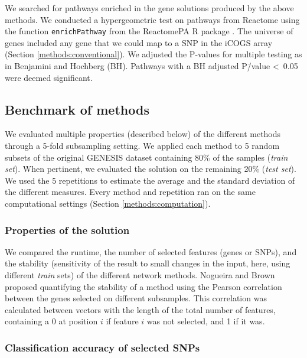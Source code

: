 \documentclass[10pt,letterpaper]{article}
\begin{document}
We searched for pathways enriched in the gene solutions produced by the above methods. We conducted a hypergeometric test on pathways from Reactome \cite{Jassal2019} using the function \texttt{enrichPathway} from the ReactomePA R package \cite{Yu2016}. The universe of genes included any gene that we could map to a SNP in the iCOGS array (Section \ref{methods:conventional}). We adjusted the P-values for multiple testing as in Benjamini and Hochberg \cite{Benjamini1995} (BH). Pathways with a BH adjusted P\=/value \textless~0.05 were deemed significant.

\subsection{Benchmark of methods}
\label{methods:benchmark}

We evaluated multiple properties (described below) of the different methods through a 5-fold subsampling setting. We applied each method to 5 random subsets of the original GENESIS dataset containing 80\% of the samples (\emph{train set}). When pertinent, we evaluated the solution on the remaining 20\% (\emph{test set}). We used the 5 repetitions to estimate the average and the standard deviation of the different measures. Every method and repetition ran on the same computational settings (Section \ref{methods:computation}).

\subsubsection{Properties of the solution}
\label{methods:algorithm_comparison}

We compared the runtime, the number of selected features (genes or SNPs), and the stability (sensitivity of the result to small changes in the input, here, using different \emph{train} sets) of the different network methods. Nogueira and Brown \cite{nogueira_measuring_2016} proposed quantifying the stability of a method using the Pearson correlation between the genes selected on different subsamples. This correlation was calculated between vectors with the length of the total number of features, containing a 0 at position $i$ if feature $i$ was not selected, and 1 if it was.

\subsubsection{Classification accuracy of selected SNPs}
\label{methods:classifier}
\end{document}
